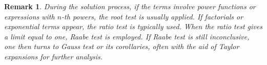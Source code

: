 \documentclass[12pt]{article}
\theoremstyle{oneline}
\newtheorem{remark}{Remark}[subsection]
\theoremstyle{twoline}
\begin{document}
\begin{remark}
  During the solution process, if the terms involve power functions or expressions with $n$-th powers, the root test is usually applied. If factorials or exponential terms appear, the ratio test is typically used. When the ratio test gives a limit equal to one, Raabe test is employed. If Raabe test is still inconclusive, one then turns to Gauss test or its corollaries, often with the aid of Taylor expansions for further analysis.
\end{remark}
\end{document}
